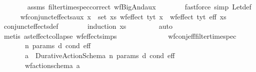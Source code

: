 \begin{isabellebody}
%
\isadelimproof
\ \ \ \ \ \ %
\endisadelimproof
%
\isatagproof
{}\isamarkupfalse%
\ assms\ filter{\isacharunderscore}{\kern0pt}time{\isacharunderscore}{\kern0pt}spec{\isacharunderscore}{\kern0pt}correct\ wf{\isacharunderscore}{\kern0pt}BigAnd{\isacharunderscore}{\kern0pt}aux\isanewline
\ \ \ \ \ \ \isamarkupfalse%
\ {\isacharparenleft}{\kern0pt}fastforce\ simp{\isacharcolon}{\kern0pt}\ Let{\isacharunderscore}{\kern0pt}def{\isacharparenright}{\kern0pt}%
\endisatagproof
{\isafoldproof}%
%
\isadelimproof
\isanewline
%
\endisadelimproof
\isanewline
\ \ \ \ \isamarkupfalse%
\ wf{\isacharunderscore}{\kern0pt}conjunct{\isacharunderscore}{\kern0pt}effects{\isacharunderscore}{\kern0pt}aux{\isacharcolon}{\kern0pt}\ {\isachardoublequoteopen}{\isasymforall}x\ {\isasymin}\ set\ xs{\isachardot}{\kern0pt}\ wf{\isacharunderscore}{\kern0pt}effect\ tyt\ x\ {\isasymLongrightarrow}\ wf{\isacharunderscore}{\kern0pt}effect\ tyt\ {\isacharparenleft}{\kern0pt}{\isasymAnd}\isactrlsub e\isactrlsub f\isactrlsub f\ xs{\isacharparenright}{\kern0pt}{\isachardoublequoteclose}\isanewline
%
\isadelimproof
\ \ \ \ \ \ %
\endisadelimproof
%
\isatagproof
{}\isamarkupfalse%
\ conjunct{\isacharunderscore}{\kern0pt}effects{\isacharunderscore}{\kern0pt}def\isanewline
\ \ \ \ \ \ \isamarkupfalse%
\ {\isacharparenleft}{\kern0pt}induction\ xs{\isacharparenright}{\kern0pt}\ \isanewline
\ \ \ \ \ \ \isamarkupfalse%
\ auto\isanewline
\ \ \ \ \ \ \isamarkupfalse%
\ {\isacharparenleft}{\kern0pt}metis\ ast{\isacharunderscore}{\kern0pt}effect{\isachardot}{\kern0pt}collapse\ wf{\isacharunderscore}{\kern0pt}effect{\isachardot}{\kern0pt}simps{\isacharparenright}{\kern0pt}{\isacharplus}{\kern0pt}\isanewline
\ \ \ \ \ \ \isamarkupfalse%
%
\endisatagproof
{\isafoldproof}%
%
\isadelimproof
%
\endisadelimproof
\ \isanewline
\isanewline
\ \ \ \ \isamarkupfalse%
\ wf{\isacharunderscore}{\kern0pt}conj{\isacharunderscore}{\kern0pt}eff{\isacharunderscore}{\kern0pt}filter{\isacharunderscore}{\kern0pt}time{\isacharunderscore}{\kern0pt}spec{\isacharcolon}{\kern0pt}\isanewline
\ \ \ \ \ \ \ n\ params\ d\ cond\ eff\isanewline
\ \ \ \ \ \ \ {\isachardoublequoteopen}a\ {\isasymequiv}\ Durative{\isacharunderscore}{\kern0pt}Action{\isacharunderscore}{\kern0pt}Schema\ n\ params\ d\ cond\ eff{\isachardoublequoteclose}\ \ \isanewline
\ \ \ \ \ \ \ {\isachardoublequoteopen}wf{\isacharunderscore}{\kern0pt}action{\isacharunderscore}{\kern0pt}schema\ a{\isachardoublequoteclose}\isanewline

\end{isabellebody}
